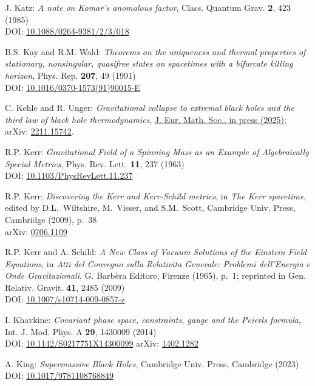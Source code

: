 \begin{thebibliography}{123}
J. Katz:
{\em A note on Komar's anomalous factor},
Class. Quantum Grav. {\bf 2}, 423 (1985)\\
DOI: \href{https://doi.org/10.1088/0264-9381/2/3/018}{10.1088/0264-9381/2/3/018}

B.S. Kay and R.M. Wald:
{\em Theorems on the uniqueness and thermal properties of stationary, nonsingular, quasifree states on spacetimes with a bifurcate killing horizon},
Phys. Rep. {\bf 207}, 49 (1991)\\
DOI: \href{https://doi.org/10.1016/0370-1573(91)90015-E}{10.1016/0370-1573(91)90015-E}

C. Kehle and R. Unger:
{\em Gravitational collapse to extremal black holes and the third law of black hole thermodynamics},
\href{https://doi.org/10.4171/jems/1591}{J. Eur. Math. Soc., in press (2025)};
arXiv: \href{https://arxiv.org/abs/2211.15742}{2211.15742}.

R.P. Kerr:
{\em Gravitational Field of a Spinning Mass as an Example of Algebraically Special Metrics},
Phys. Rev. Lett. {\bf 11}, 237 (1963)\\
DOI: \href{https://doi.org/10.1103/PhysRevLett.11.237}{10.1103/PhysRevLett.11.237}

R.P. Kerr: {\em Discovering the Kerr and Kerr-Schild metrics},
in {\em The Kerr spacetime}, edited by D.L.~Wiltshire, M.~Visser, and S.M.~Scott,
Cambridge Univ. Press, Cambridge (2009), p.~38\\
arXiv: \href{https://arxiv.org/abs/0706.1109}{0706.1109}

R.P. Kerr and A. Schild:
{\em A New Class of Vacuum Solutions of the Einstein Field Equations},
in {\em Atti del Convegno sulla Relativita Generale: Problemi
dell’Energia e Onde Gravitazionali}, G. Barbèra Editore,
Firenze (1965), p.~1; reprinted in
Gen. Relativ. Gravit. {\bf 41}, 2485 (2009)\\
DOI: \href{https://doi.org/10.1007/s10714-009-0857-z}{10.1007/s10714-009-0857-z}

I. Khavkine:
{\em Covariant phase space, constraints, gauge and the Peierls formula},
Int. J. Mod. Phys. A  {\bf 29}, 1430009 (2014)\\
DOI: \href{https://doi.org/10.1142/S0217751X14300099}{10.1142/S0217751X14300099}\hfill
arXiv: \href{https://arxiv.org/abs/1402.1282}{1402.1282}

A. King:
{\em Supermassive Black Holes},
Cambridge Univ. Press, Cambridge (2023)\\
DOI: \href{https://doi.org/10.1017/9781108768849}{10.1017/9781108768849}


\end{thebibliography}
